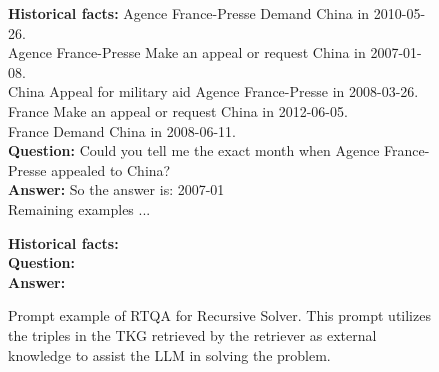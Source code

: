 \documentclass[11pt]{article}
\begin{document}
\begin{figure}[!h]
\begin{tcolorbox}
{\textbf{Historical facts:}
Agence France-Presse Demand China in 2010-05-26. \\
Agence France-Presse Make an appeal or request China in 2007-01-08. \\
China Appeal for military aid Agence France-Presse in 2008-03-26. \\
France Make an appeal or request China in 2012-06-05. \\
France Demand China in 2008-06-11. \\
\textbf{Question:} Could you tell me the exact month when Agence France-Presse appealed to China? \\
\textbf{Answer:} So the answer is: 2007-01 \\[0.5em]

Remaining examples ...
\vspace{0.5em}

\textbf{Historical facts:}  \\
\textbf{Question:} \\
\textbf{Answer:}
} %
\end{tcolorbox}
\caption{Prompt example of RTQA for Recursive Solver. This prompt utilizes the triples in the TKG retrieved by the retriever as external knowledge to assist the LLM in solving the problem.}
\label{fig:prompt solver historal}
\end{figure}
\end{document}
